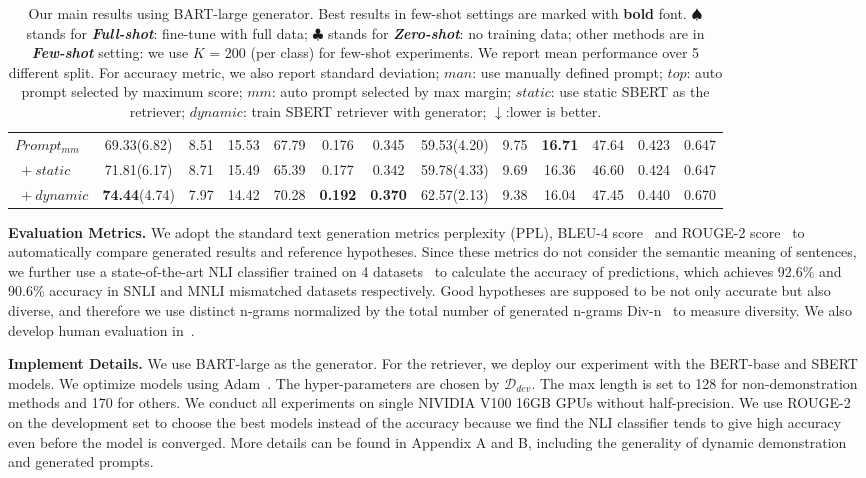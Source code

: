 \begin{table}[t!]
\begin{tabular}{l|cccccc|cccccc}
		\midrule
		$Prompt_{mm}$ & 69.33(6.82) & 8.51 &15.53 & 67.79& 0.176& 0.345& 59.53(4.20)&9.75 &\textbf{16.71} &47.64 &0.423 &0.647 \\
		$\ +static$ & 71.81(6.17) &8.71 & 15.49& 65.39& 0.177& 0.342& 59.78(4.33)& 9.69& 16.36& 46.60& 0.424& 0.647\\
		$\ +dynamic$ & \textbf{74.44}(4.74) & 7.97&14.42 &70.28 &\textbf{0.192} &\textbf{0.370} &62.57(2.13) &9.38 &16.04 &47.45 &0.440 &0.670 \\
		\bottomrule
	\end{tabular}
	\caption{Our main results using BART-large generator. Best results in few-shot settings are marked with \textbf{bold} font. $\spadesuit$ stands for \textbf{\textit{Full-shot}}: fine-tune with full data; $\clubsuit$  stands for \textbf{\textit{Zero-shot}}: no training data; other methods are in \textbf{\textit{Few-shot}} setting: we use $K$ = 200 (per class) for few-shot experiments. We report mean performance over 5 different split. For accuracy metric, we also report standard deviation; $man$: use manually defined prompt; $top$: auto prompt selected by maximum score; $mm$: auto prompt selected by max margin; $static$: use static SBERT as the retriever; $dynamic$: train SBERT retriever with generator; $\downarrow$:lower is better.}
	\label{table:linkprediction}
\end{table}

\noindent
\textbf{Evaluation Metrics.} We adopt the standard text generation metrics perplexity (PPL), BLEU-4 score~\citep{papineni2002bleu} and ROUGE-2 score~\citep{lin-2004-rouge} to automatically compare generated results and reference hypotheses. Since these metrics do not consider the semantic meaning of sentences, we further use a state-of-the-art NLI classifier trained on 4 datasets~\citep{nie-etal-2020-adversarial} to calculate the accuracy of predictions, which achieves 92.6\% and 90.6\% accuracy in SNLI and MNLI mismatched datasets respectively. Good hypotheses are supposed to be not only accurate but also diverse, and therefore we use distinct n-grams normalized by the total number of generated n-grams Div-n~\citep{li-etal-2016-diversity} to measure diversity.
We also develop human evaluation in~.

\noindent
\textbf{Implement Details.} We use BART-large as the generator. For the retriever, we deploy our experiment with the BERT-base and SBERT models. We optimize models using Adam~\citep{DBLP:journals/corr/KingmaB14}. The hyper-parameters are chosen by $\mathcal{D}_{dev}$. The max length is set to 128 for non-demonstration methods and 170 for others. We conduct all experiments on single NIVIDIA V100 16GB GPUs without half-precision. We use ROUGE-2 on the development set to choose the best models instead of the accuracy because we find the NLI classifier tends to give high accuracy even before the model is converged. More details can be found in Appendix A and B, including the generality of dynamic demonstration and generated prompts.

